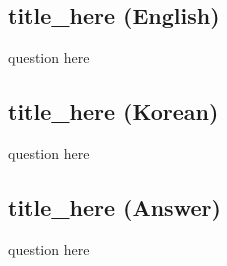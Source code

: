 \cleardoublepage
\subsection{title_here (English)}

question here



\newpage
\subsection{title_here (Korean)}

question here



\newpage
\subsection{title_here (Answer)}

question here
